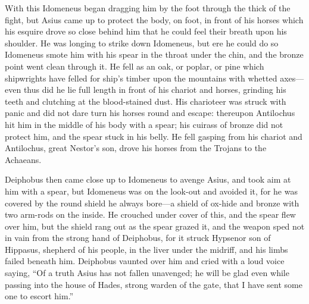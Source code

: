 With this Idomeneus began dragging him by the foot through the thick of
the fight, but Asius came up to protect the body, on foot, in front of his
horses which his esquire drove so close behind him that he could feel
their breath upon his shoulder. He was longing to strike down Idomeneus,
but ere he could do so Idomeneus smote him with his spear in the throat
under the chin, and the bronze point went clean through it. He fell as an
oak, or poplar, or pine which shipwrights have felled for ship’s timber
upon the mountains with whetted axes—even thus did he lie full
length in front of his chariot and horses, grinding his teeth and
clutching at the blood-stained dust. His charioteer was struck with panic
and did not dare turn his horses round and escape: thereupon Antilochus
hit him in the middle of his body with a spear; his cuirass of bronze did
not protect him, and the spear stuck in his belly. He fell gasping from
his chariot and Antilochus, great Nestor’s son, drove his horses from the
Trojans to the Achaeans.

Deiphobus then came close up to Idomeneus to avenge Asius, and took aim at
him with a spear, but Idomeneus was on the look-out and avoided it, for he
was covered by the round shield he always bore—a shield of ox-hide
and bronze with two arm-rods on the inside. He crouched under cover of
this, and the spear flew over him, but the shield rang out as the spear
grazed it, and the weapon sped not in vain from the strong hand of
Deiphobus, for it struck Hypsenor son of Hippasus, shepherd of his people,
in the liver under the midriff, and his limbs failed beneath him.
Deiphobus vaunted over him and cried with a loud voice saying, “Of a truth
Asius has not fallen unavenged; he will be glad even while passing into
the house of Hades, strong warden of the gate, that I have sent some one
to escort him.”

